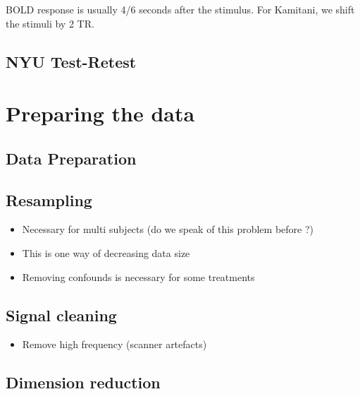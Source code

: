 \documentclass{frontiersSCNS} %
\begin{document}
BOLD response is usually 4/6 seconds after the stimulus. For Kamitani, we shift
the stimuli by 2 TR.

\subsection{NYU Test-Retest}



\section{Preparing the data}

\subsection{Data Preparation}


\subsection{Resampling}

\begin{itemize}
    \item Necessary for multi subjects (do we speak of this problem before ?)
    \item This is one way of decreasing data size
    \item Removing confounds is necessary for some treatments
\end{itemize}

\subsection{Signal cleaning}

\begin{itemize}
    \item Remove high frequency (scanner artefacts)
\end{itemize}


\subsection{Dimension reduction}
\end{document}
